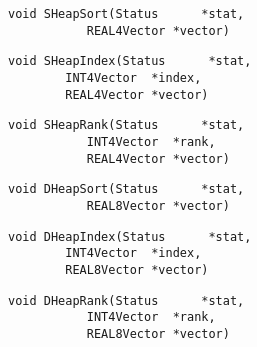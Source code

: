 \vspace{-0.1in}
\begin{verbatim}
void SHeapSort(Status      *stat,
	       REAL4Vector *vector)
\end{verbatim}
\vspace{-0.1in}
\begin{verbatim}
void SHeapIndex(Status      *stat,
		INT4Vector  *index,
		REAL4Vector *vector)
\end{verbatim}
\vspace{-0.1in}
\begin{verbatim}
void SHeapRank(Status      *stat,
	       INT4Vector  *rank,
	       REAL4Vector *vector)
\end{verbatim}
\vspace{-0.1in}
\begin{verbatim}
void DHeapSort(Status      *stat,
	       REAL8Vector *vector)
\end{verbatim}
\vspace{-0.1in}
\begin{verbatim}
void DHeapIndex(Status      *stat,
		INT4Vector  *index,
		REAL8Vector *vector)
\end{verbatim}
\vspace{-0.1in}
\begin{verbatim}
void DHeapRank(Status      *stat,
	       INT4Vector  *rank,
	       REAL8Vector *vector)
\end{verbatim}
